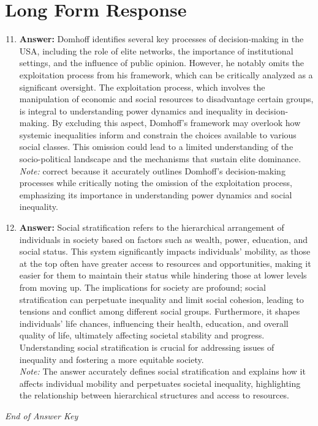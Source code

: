 \documentclass[12pt]{article}
\begin{document}
\section*{Long Form Response}
\begin{enumerate}[label=\arabic*.]
\setcounter{enumi}{10}
\item \textbf{Answer:} Domhoff identifies several key processes of decision-making in the USA, including the role of elite networks, the importance of institutional settings, and the influence of public opinion. However, he notably omits the exploitation process from his framework, which can be critically analyzed as a significant oversight. The exploitation process, which involves the manipulation of economic and social resources to disadvantage certain groups, is integral to understanding power dynamics and inequality in decision-making. By excluding this aspect, Domhoff's framework may overlook how systemic inequalities inform and constrain the choices available to various social classes. This omission could lead to a limited understanding of the socio-political landscape and the mechanisms that sustain elite dominance.
\\ \textit{Note:} correct because it accurately outlines Domhoff's decision-making processes while critically noting the omission of the exploitation process, emphasizing its importance in understanding power dynamics and social inequality.
\item \textbf{Answer:} Social stratification refers to the hierarchical arrangement of individuals in society based on factors such as wealth, power, education, and social status. This system significantly impacts individuals' mobility, as those at the top often have greater access to resources and opportunities, making it easier for them to maintain their status while hindering those at lower levels from moving up. The implications for society are profound; social stratification can perpetuate inequality and limit social cohesion, leading to tensions and conflict among different social groups. Furthermore, it shapes individuals' life chances, influencing their health, education, and overall quality of life, ultimately affecting societal stability and progress. Understanding social stratification is crucial for addressing issues of inequality and fostering a more equitable society.
\\ \textit{Note:} The answer accurately defines social stratification and explains how it affects individual mobility and perpetuates societal inequality, highlighting the relationship between hierarchical structures and access to resources.
\end{enumerate}

\vfill
\noindent\textit{End of Answer Key}
\end{document}
